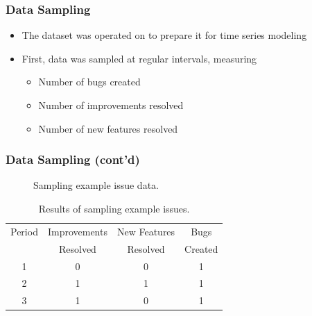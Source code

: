 \documentclass[presentation]{beamer}
\begin{document}
\begin{frame}[t]
\frametitle{Data Sampling}
\begin{itemize}
\item{The dataset was operated on to prepare it for time series modeling}
\item{First, data was sampled at regular intervals, measuring
  \begin{itemize}
  \item{Number of bugs created}
  \item{Number of improvements resolved}
  \item{Number of new features resolved}
  \end{itemize}
}
\end{itemize}
\end{frame}

\begin{frame}[t]
\frametitle{Data Sampling (cont'd)}

\tiny{
  \begin{figure}[htbp]
  \begin{center}
  \caption{Sampling example issue data.}
  \end{center}
  \end{figure}

  \vspace{.2cm}
  \begin{table}[htbp]
  \centering
  \begin{tabular}{ c | c | c | c }
  \hline
  Period & Improvements & New Features & Bugs \\
  ~& Resolved & Resolved & Created \\
  \hline
  1 & 0 & 0 & 1 \\
  2 & 1 & 1 & 1 \\
  3 & 1 & 0 & 1 \\
  \hline
  \end{tabular}
  \caption{Results of sampling example issues.}
  \end{table}
}
\end{frame}
\end{document}

